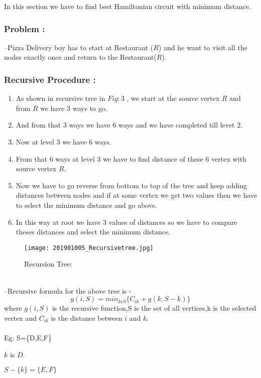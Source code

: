 \documentclass{article}
\begin{document}
    In this section we have to find best Hamiltonian circuit with minimum distance.
    \subsubsection{Problem :}
    --Pizza Delivery boy has to start at Restaurant ($R$) and he want to visit all the nodes exactly once and return to the Restaurant($R$).
    \subsubsection{Recursive Procedure :}
    \begin{enumerate}
        \item As shown in recursive tree in $Fig:3$ , we start at the source vertex $R$ and from $R$ we have $3$ ways to go.
        \item And from that $3$ ways we have $6$ ways and we have completed till levet $2$.
        \item Now at level $3$ we have $6$ ways.
        \item From that $6$ ways at level $3$ we have to find distance of these $6$ vertex with source vertex $R$.
        \item Now we have to go reverse from bottom to top of the tree and keep adding distances between nodes and if at some vertex we get two values then we have to select the minimum distance and go above.
        \item In this way at root we have $3$ values of distances so we have to compare theses distances and select the minimum distance.
    \end{enumerate}
    \newpage
    \begin{figure}[h]
        \centering
        \texttt{[image: 201901005\_Recursivetree.jpg]}
        \caption{Recursion Tree:}
        \label{fig:recursivetree}
    \end{figure}\\
    --Recursive formula for the above tree is - 
    $$g(i,S)=min_{k\epsilon S}\{C_{ik} + g(k,S-{k})\}$$
    where $g(i,S)$ is the recursive function,S is the set of all vertices,k is the selected vertex and $C_{ik}$ is the distance between $i$ and $k$.\\
    \\
    Eg: S=\{D,E,F\}
    
    $k$ is $D$.
    
    $S-\{k\} = \{E,F\}$
    
\end{document}
